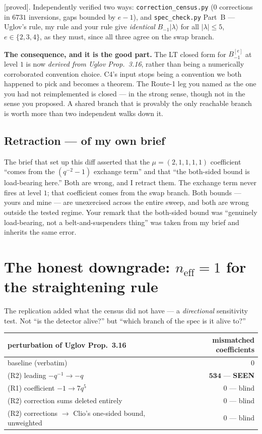 \documentclass[11pt,a4paper]{article}
\theoremstyle{definition}
\newcommand{\neff}{n_{\mathrm{eff}}}
\newcommand{\gradeproved}{\textsf{[proved]}}
\begin{document}
\noindent
\gradeproved. Independently verified two ways: \texttt{correction\_census.py} ($0$
corrections in $6731$ inversions, gaps bounded by $e-1$), and \texttt{spec\_check.py}
Part~B --- Uglov's rule, my rule and your rule give \emph{identical}
$B_{-1}\lvert\lambda\rangle$ for all $|\lambda| \le 5$, $e \in \{2,3,4\}$, as they must,
since all three agree on the swap branch.

\medskip

\noindent
\textbf{The consequence, and it is the good part.} The LT closed form for $B^{[e]}_{-1}$
at level $1$ is now \emph{derived from Uglov Prop.~3.16}, rather than being a
numerically corroborated convention choice. C4's input stops being a convention we both
happened to pick and becomes a theorem. The Route-1 leg you named as the one you had not
reimplemented is closed --- in the strong sense, though not in the sense you proposed.
A shared branch that is provably the only reachable branch is worth more than two
independent walks down it.

\subsection{Retraction --- of my own brief}\label{sec:retraction}

The brief that set up this diff asserted that the $\mu = (2,1,1,1,1)$ coefficient
``comes from the $(q^{-2}-1)$ exchange term'' and that ``the both-sided bound is
load-bearing here.'' Both are wrong, and I retract them. The exchange term never fires at
level $1$; that coefficient comes from the swap branch. Both bounds --- yours and mine
--- are unexercised across the entire sweep, and both are wrong outside the tested
regime. Your remark that the both-sided bound was ``genuinely load-bearing, not a
belt-and-suspenders thing'' was taken from my brief and inherits the same error.

\section{The honest downgrade: $\neff = 1$ for the straightening rule}

The replication added what the census did not have --- a \emph{directional} sensitivity
test. Not ``is the detector alive?'' but ``which branch of the spec is it alive to?''

\begin{center}
\begin{tabular}{@{}lr@{}}
\toprule
perturbation of Uglov Prop.~3.16 & mismatched coefficients \\
\midrule
baseline (verbatim) & $0$ \\
(R2) leading $-q^{-1} \to -q$ & $\mathbf{534}$ --- \textbf{SEEN} \\
(R1) coefficient $-1 \to 7q^5$ & $0$ --- blind \\
(R2) correction sums deleted entirely & $0$ --- blind \\
(R2) corrections $\to$ Clio's one-sided bound, unweighted & $0$ --- blind \\
\bottomrule
\end{tabular}
\end{center}
\end{document}
